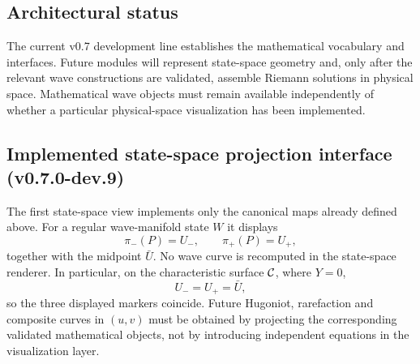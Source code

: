 \subsection{Architectural status}
The current v0.7 development line establishes the mathematical vocabulary and interfaces.  Future modules will represent state-space geometry and, only after the relevant wave constructions are validated, assemble Riemann solutions in physical space.  Mathematical wave objects must remain available independently of whether a particular physical-space visualization has been implemented.

\subsection{Implemented state-space projection interface (v0.7.0-dev.9)}
The first state-space view implements only the canonical maps already defined above.  For a regular wave-manifold state $W$ it displays
\[
  \pi_-(P)=U_-,\qquad \pi_+(P)=U_+,
\]
together with the midpoint $\bar U$.  No wave curve is recomputed in the state-space renderer.  In particular, on the characteristic surface $\mathcal{C}$, where $Y=0$,
\[
  U_-=U_+=\bar U,
\]
so the three displayed markers coincide.  Future Hugoniot, rarefaction and composite curves in $(u,v)$ must be obtained by projecting the corresponding validated mathematical objects, not by introducing independent equations in the visualization layer.
